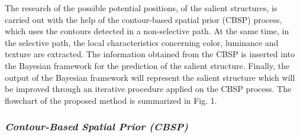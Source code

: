 The research of the possible potential positions, of the salient structures, is 
carried out with the help of the contour-based spatial prior (CBSP) process, 
which uses the contours detected in a non-selective path. At the same time, 
in the selective path, the local characteristics concerning color, luminance 
and texture are extracted. The information obtained from the CBSP is inserted 
into the Bayesian framework for the prediction of the salient structure. 
Finally, the output of the Bayesian framework will represent the salient structure 
which will be improved through an iterative procedure applied on the 
CBSP process. The flowchart of the proposed method is summarized in Fig. 1.

\subsubsection{\emph{Contour-Based Spatial Prior (CBSP)}}


